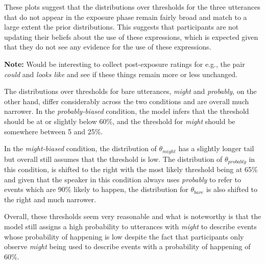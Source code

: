 \documentclass[lucida,biblatex]{sp} %
\begin{document}
These plots suggest that the distributions over thresholds for the three utterances that do not appear in the exposure phase remain fairly broad and match to a large extent the prior distributions.
This suggests that participants are not updating their beliefs about the use of these expressions, which is expected given that they do not see any evidence for the use of these expressions. 

\vspace{1em}
\textbf{Note:} Would be interesting to collect post-exposure ratings for e.g., the pair \textit{could} and \textit{looks like} and see if these things remain more or less unchanged.
\vspace{1em}

The distributions over thresholds for bare utterances, \textit{might} and \textit{probably}, on the other hand, differ considerably across the two conditions and are overall much narrower. In the \textit{probably-biased} condition, 
the model infers that the threshold should be at or slightly below 60\%, and the threshold for \textit{might} should be somewhere between 5 and 25\%.

In the \textit{might-biased} condition, the distribution of $\theta_{might}$ has a slightly longer tail but overall still assumes that the threshold is low.  The distribution of $\theta_{probably}$ in this condition, is shifted to the right with the most likely threshold being at 65\% and given that the speaker in this condition always uses \textit{probably} to refer to events which are 90\% likely to happen, the distribution for $\theta_{bare}$ is also shifted to the right and much narrower. 

Overall, these thresholds seem very reasonable and what is noteworthy is that the model still assigns a high probability to utterances with \textit{might} to describe events whose probability of happening is low despite the fact that participants only observe \textit{might} being used to describe  events with a probability of happening of 60\%.


\printbibliography
%




\end{document}
